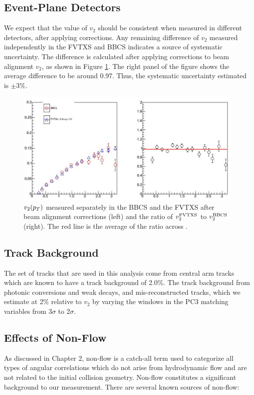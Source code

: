 \subsection{Event-Plane Detectors}
We expect that the value of $v_2$ should be consistent when measured in different detectors, after applying corrections. Any remaining difference of $v_2$ measured independently in the FVTXS and BBCS indicates a source of systematic uncertainty. The difference is calculated after applying corrections to beam alignment $v_2$, as shown in Figure \ref{fig:v2_fvtx_bbc_compare}. The right panel of the figure shows the average difference to be around 0.97. Thus, the systematic uncertainty estimated is $\pm$3\%.
\begin{figure}[!h]
\begin{center}
\includegraphics[width=0.6\linewidth]{figs/v2_fvtx_bbc_compare_w_correction.png}
\caption{$v_2(\mbox{$p_T$})$ measured separately in the BBCS and the FVTXS after beam alignment corrections (left) and the ratio of $v_2^{\rm FVTXS}$ to $v_2^{\rm BBCS}$ (right). The red line is the average of the ratio across \pt.}
\label{fig:v2_fvtx_bbc_compare}
\end{center}
\end{figure}

\subsection{Track Background}
The set of tracks that are used in this analysis come from central arm tracks which are known to have a track background of 2.0\%. The track background from photonic conversions and weak decays, and mis-reconstructed tracks, which we estimate at 2\% relative to $v_2$ by varying the windows in the PC3 matching variables from 3$\sigma$ to 2$\sigma$.
\subsection{Effects of Non-Flow}
\label{sec:non_flow_intro}
As discussed in Chapter 2, non-flow is a catch-all term used to categorize all types of angular correlations which do not arise from hydrodynamic flow and are not related to the initial collision geometry. Non-flow constitutes a significant background to our measurement. There are several known sources of non-flow:

